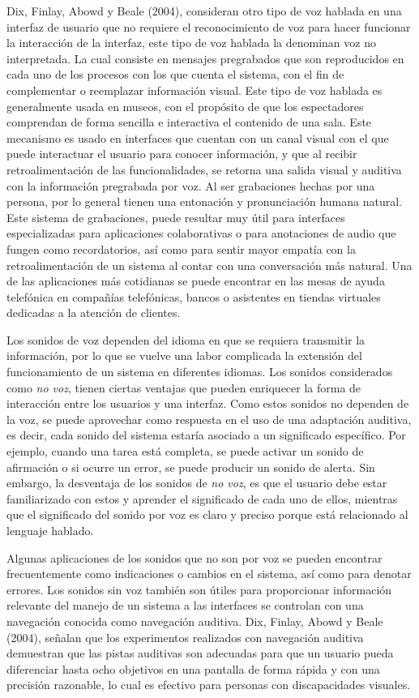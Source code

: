Dix, Finlay, Abowd y Beale (2004), consideran otro tipo de voz hablada en una interfaz de usuario que no requiere el reconocimiento de voz para hacer funcionar la interacción de la interfaz, este tipo de voz hablada la denominan voz no interpretada. La cual consiste en mensajes pregrabados que son reproducidos en cada uno de los procesos con los que cuenta el sistema, con el fin de complementar o reemplazar información visual. Este tipo de voz hablada es generalmente usada en museos, con el propósito de que los espectadores comprendan de forma sencilla e interactiva el contenido de una sala. Este mecanismo es usado en interfaces que cuentan con un canal visual con el que puede interactuar el usuario para conocer información, y que al recibir retroalimentación de las funcionalidades, se retorna una salida visual y auditiva con la información pregrabada por voz. Al ser grabaciones hechas por una persona, por lo general tienen una entonación y pronunciación humana natural. Este sistema de grabaciones, puede resultar muy útil para interfaces especializadas para aplicaciones colaborativas o para anotaciones de audio que fungen como recordatorios, así como para sentir mayor empatía con la retroalimentación de un sistema al contar con una conversación más natural. Una de las aplicaciones más cotidianas se puede encontrar en las mesas de ayuda telefónica en compañías telefónicas, bancos o asistentes en tiendas virtuales dedicadas a la atención de clientes.

Los sonidos de voz dependen del idioma en que se requiera transmitir la información, por lo que se vuelve una labor complicada la extensión del funcionamiento de un sistema en diferentes idiomas. Los sonidos considerados como \textit{no voz}, tienen ciertas ventajas que pueden enriquecer la forma de interacción entre los usuarios y una interfaz. Como estos sonidos no dependen de la voz, se puede aprovechar como respuesta en el uso de una adaptación auditiva, es decir, cada sonido del sistema estaría asociado a un significado específico. Por ejemplo, cuando una tarea está completa, se puede activar un sonido de afirmación o si ocurre un error, se puede producir un sonido de alerta. Sin embargo, la desventaja de los sonidos de \textit{no voz}, es que el usuario debe estar familiarizado con estos y aprender el significado de cada uno de ellos, mientras que el significado del sonido por voz es claro y preciso porque está relacionado al lenguaje hablado.

Algunas aplicaciones de los sonidos que no son por voz se pueden encontrar frecuentemente como indicaciones o cambios en el sistema, así como para denotar errores. Los sonidos sin voz también son útiles para proporcionar información relevante del manejo de un sistema a las interfaces se controlan con una navegación conocida como navegación auditiva. Dix, Finlay, Abowd y Beale (2004), señalan que los experimentos realizados con navegación auditiva demuestran que las pistas auditivas son adecuadas para que un usuario pueda diferenciar hasta ocho objetivos en una pantalla de forma rápida y con una precisión razonable, lo cual es efectivo para personas con discapacidades visuales.

